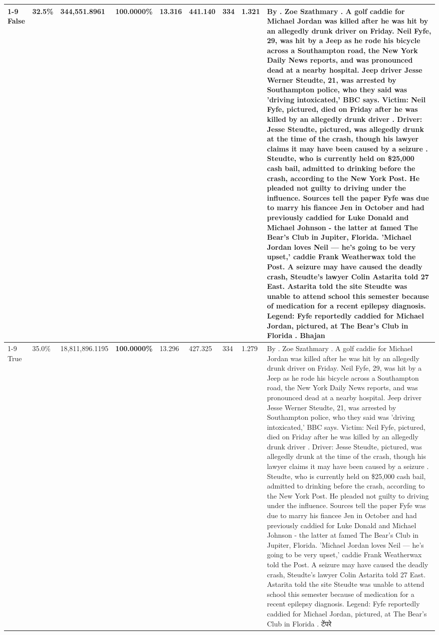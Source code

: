 \begin{table}[H]
\begin{tabular}{lllrlllll}
\cline{1-9}
False & 32.5\% & 344,551.8961 & \bfseries \color{red} 100.0000\% & 13.316 & 441.140 & 334 & 1.321 & By . Zoe Szathmary . A golf caddie for Michael Jordan was killed after he was hit by an allegedly drunk driver on Friday. Neil Fyfe, 29, was hit by a Jeep as he rode his bicycle across a Southampton road, the New York Daily News reports, and was pronounced dead at a nearby hospital. Jeep driver Jesse Werner Steudte, 21, was arrested by Southampton police, who they said was 'driving intoxicated,' BBC says. Victim: Neil Fyfe, pictured, died on Friday after he was killed by an allegedly drunk driver . Driver: Jesse Steudte, pictured, was allegedly drunk at the time of the crash, though his lawyer claims it may have been caused by a seizure . Steudte, who is currently held on \$25,000 cash bail, admitted to drinking before the crash, according to the New York Post. He pleaded not guilty to driving under the influence. Sources tell the paper Fyfe was due to marry his fiancee Jen in October and had previously caddied for Luke Donald and Michael Johnson - the latter at famed The Bear's Club in Jupiter, Florida. 'Michael Jordan loves Neil — he’s going to be very upset,' caddie Frank Weatherwax told the Post. A seizure may have caused the deadly crash, Steudte's lawyer Colin Astarita told 27 East. Astarita told the site Steudte was unable to attend school this semester because of medication for a recent epilepsy diagnosis. Legend: Fyfe reportedly caddied for Michael Jordan, pictured, at The Bear's Club in Florida . Bhajan \\
\cline{1-9}
True & 35.0\% & 18,811,896.1195 & \bfseries \color{red} 100.0000\% & 13.296 & 427.325 & 334 & 1.279 & By . Zoe Szathmary . A golf caddie for Michael Jordan was killed after he was hit by an allegedly drunk driver on Friday. Neil Fyfe, 29, was hit by a Jeep as he rode his bicycle across a Southampton road, the New York Daily News reports, and was pronounced dead at a nearby hospital. Jeep driver Jesse Werner Steudte, 21, was arrested by Southampton police, who they said was 'driving intoxicated,' BBC says. Victim: Neil Fyfe, pictured, died on Friday after he was killed by an allegedly drunk driver . Driver: Jesse Steudte, pictured, was allegedly drunk at the time of the crash, though his lawyer claims it may have been caused by a seizure . Steudte, who is currently held on \$25,000 cash bail, admitted to drinking before the crash, according to the New York Post. He pleaded not guilty to driving under the influence. Sources tell the paper Fyfe was due to marry his fiancee Jen in October and had previously caddied for Luke Donald and Michael Johnson - the latter at famed The Bear's Club in Jupiter, Florida. 'Michael Jordan loves Neil — he’s going to be very upset,' caddie Frank Weatherwax told the Post. A seizure may have caused the deadly crash, Steudte's lawyer Colin Astarita told 27 East. Astarita told the site Steudte was unable to attend school this semester because of medication for a recent epilepsy diagnosis. Legend: Fyfe reportedly caddied for Michael Jordan, pictured, at The Bear's Club in Florida . टेंपरे \\

\end{tabular}
\end{table}
